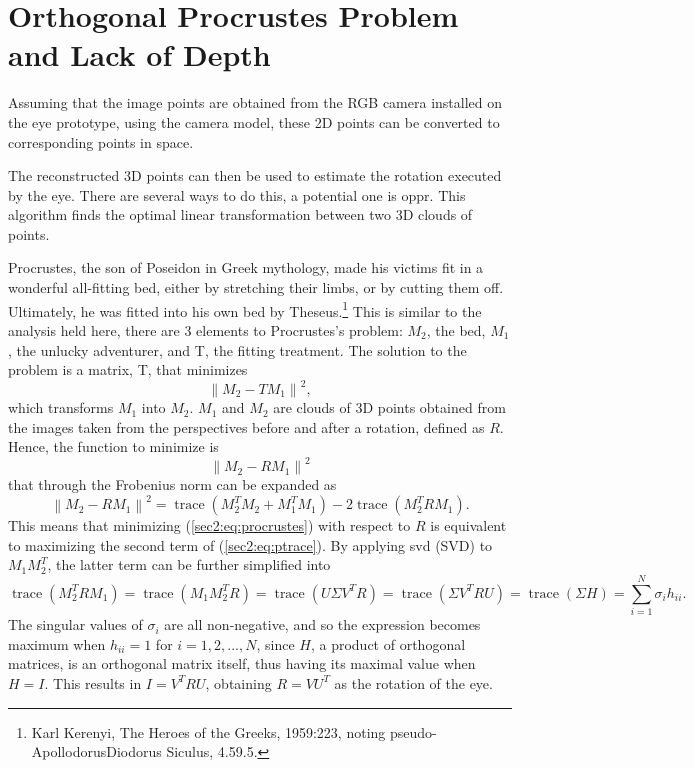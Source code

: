 
\section{Orthogonal Procrustes Problem and Lack of Depth}
\label{cha2:opprandsphere}

Assuming that the image points are obtained from the RGB camera installed on the eye prototype, using the camera model, these 2D points can be converted to corresponding points in space. 

The reconstructed 3D points can then be used to estimate the rotation executed by the eye. There are several ways to do this, a potential one is \acrfull{oppr}. This algorithm finds the optimal linear transformation between two 3D clouds of points.

Procrustes, the son of Poseidon in Greek mythology, made his victims fit in a wonderful all-fitting bed, either by stretching their limbs, or by cutting them off. Ultimately, he was fitted into his own bed by Theseus.\footnote{Karl Kerenyi, The Heroes of the Greeks, 1959:223, noting pseudo-ApollodorusDiodorus Siculus, 4.59.5.} This is similar to the analysis held here, there are 3 elements to Procrustes's problem: $M_2$, the bed, $M_1$, the unlucky adventurer, and T, the fitting treatment. The solution to the problem is a matrix, T, that minimizes
\begin{equation}
\label{sec2:eq:procrustes}
\left \| M_2 - TM_1  \right \|^2 ,
\end{equation}
which transforms $M_1$ into $M_2$. $M_1$ and $M_2$ are clouds of 3D points obtained from the images taken from the perspectives before and after a rotation, defined as $R$. Hence, the function to minimize is
\begin{equation}
\label{sec2:eq:ptrace}
\left \| M_2 - RM_1 \right \|^2 
\end{equation}
that through the Frobenius norm can be expanded as
\begin{equation}
\label{sec2:eq:ptrace}
\left \| M_2 - RM_1 \right \|^2 = \operatorname { trace } ( M_2^T M_2 + M_1^T M_1) - 2 \operatorname { trace } (M_2^T R M_1).
\end{equation}
This means that minimizing (\ref{sec2:eq:procrustes}) with respect to $R$ is equivalent to maximizing the second term of (\ref{sec2:eq:ptrace}). By applying \gls{svd} (SVD) to $M_1 M_2^T$, the latter term can be further simplified into
\begin{equation}
\label{sec2:eq:svd}
\operatorname { trace } (M_2^T R M_1) = \operatorname { trace } (M_1 M_2^T  R) = \operatorname { trace } ( U \Sigma V^T R) = \operatorname { trace } (\Sigma V^T R U) = \operatorname { trace } (\Sigma H )  = \sum _ { i = 1 } ^ { N } \sigma _ { i }h _ { i i } .
\end{equation}
The singular values of $\sigma _ { i }$ are all non-negative, and so the expression becomes maximum when $h _ { i i } = 1$ for $i=1,2,...,N$, since $H$, a product of orthogonal matrices, is an orthogonal matrix itself, thus having its maximal value when $H = I$. This results in $I = V^T R U$, obtaining $R=V U^T$ as the rotation of the eye.   

